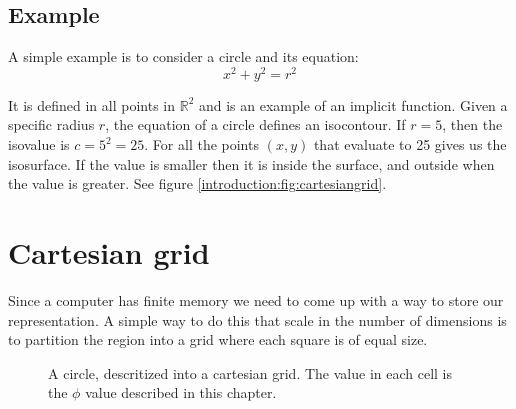 

\subsection*{Example}

A simple example is to consider a circle and its equation:
\begin{equation*} 
  x^{2} + y^{2} = r^{2}
\end{equation*}

It is defined in all points in $\mathbb{R}^{2}$ and is an example of
an implicit function. Given a specific radius $r$, the equation of a
circle defines an isocontour. If $r = 5$, then the isovalue is $c =
5^{2} = 25$. For all the points $(x,y)$ that evaluate to 25 gives us
the isosurface. If the value is smaller then it is inside the surface,
and outside when the value is greater. See figure
\vref{introduction:fig:cartesiangrid}.


\section*{Cartesian grid}

Since a computer has finite memory we need to come up with a way to
store our representation. A simple way to do this that scale in the
number of dimensions is to partition the region into a grid where each
square is of equal size.

\begin{figure}[htb] \centering
  \caption{A circle, descritized into a
cartesian grid. The value in each cell is the $\phi$ value described
in this chapter.}
  \label{introduction:fig:cartesiangrid}
\end{figure}

